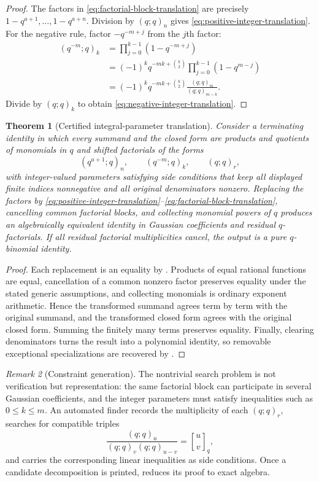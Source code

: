 \documentclass[11pt,oneside,openany]{book}
\newtheorem{theorem}{Theorem}[chapter]
\theoremstyle{definition}
\theoremstyle{remark}
\newtheorem{remark}[theorem]{Remark}
\newcommand{\Qbinom}[3]{\genfrac{[}{]}{0pt}{}{#1}{#2}_{#3}}
\begin{document}
\begin{proof}
The factors in \eqref{eq:factorial-block-translation} are precisely
$1-q^{a+1},\ldots,1-q^{a+n}$.  Division by $(q;q)_n$ gives
\eqref{eq:positive-integer-translation}.  For the negative rule, factor
$-q^{-m+j}$ from the $j$th factor:
\begin{align*}
 (q^{-m};q)_k
 &=\prod_{j=0}^{k-1}(1-q^{-m+j})\\
 &=(-1)^kq^{-mk+\binom k2}
   \prod_{j=0}^{k-1}(1-q^{m-j})\\
 &=(-1)^kq^{-mk+\binom k2}
   \frac{(q;q)_m}{(q;q)_{m-k}}.
\end{align*}
Divide by $(q;q)_k$ to obtain \eqref{eq:negative-integer-translation}.
\end{proof}

\begin{theorem}[Certified integral-parameter translation]\label{thm:certified-integral-translation}
Consider a terminating identity in which every summand and the closed form are products and quotients of monomials in $q$ and shifted factorials of the forms
\[
 (q^{a+1};q)_n,
 \qquad
 (q^{-m};q)_k,
 \qquad
 (q;q)_r,
\]
with integer-valued parameters satisfying side conditions that keep all displayed finite indices nonnegative and all original denominators nonzero.  Replacing the factors by \eqref{eq:positive-integer-translation}--\eqref{eq:factorial-block-translation}, cancelling common factorial blocks, and collecting monomial powers of $q$ produces an algebraically equivalent identity in Gaussian coefficients and residual $q$-factorials.  If all residual factorial multiplicities cancel, the output is a pure $q$-binomial identity.
\end{theorem}

\begin{proof}
Each replacement is an equality by .  Products of equal rational functions are equal, cancellation of a common nonzero factor preserves equality under the stated generic assumptions, and collecting monomials is ordinary exponent arithmetic.  Hence the transformed summand agrees term by term with the original summand, and the transformed closed form agrees with the original closed form.  Summing the finitely many terms preserves equality.  Finally, clearing denominators turns the result into a polynomial identity, so removable exceptional specializations are recovered by .
\end{proof}

\begin{remark}[Constraint generation]
The nontrivial search problem is not verification but representation: the same factorial block can participate in several Gaussian coefficients, and the integer parameters must satisfy inequalities such as $0\le k\le m$.  An automated finder records the multiplicity of each $(q;q)_r$, searches for compatible triples
\[
 \frac{(q;q)_u}{(q;q)_v(q;q)_{u-v}}
 =\Qbinom uvq,
\]
and carries the corresponding linear inequalities as side conditions.  Once a candidate decomposition is printed,  reduces its proof to exact algebra.
\end{remark}
\end{document}
